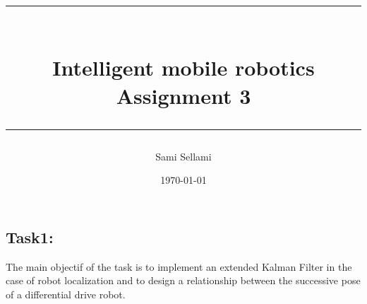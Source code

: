 \documentclass[11pt,a4paper]{report}
\title{
\rule{15cm}{1pt} \\
\Large {\bfseries Intelligent mobile robotics} \\
\Large {\bfseries Assignment 3}\\
\rule{15cm}{1pt}}
\author{Sami Sellami}
\date{\today}
\begin{document}
\setcounter{page}{1}
\setcounter{secnumdepth}{1}
	
\selectfont

\maketitle

\titlelabel{\thetitle)\quad}
\titlespacing{\chapter}{0cm}{0cm}{0cm}
\titlespacing{\section}{0.2cm}{0cm}{0cm}

\subsection{\textbf{Task1:}} 
The main objectif of the task is to implement an extended Kalman Filter in the case of robot localization and to design a relationship between the successive pose of a differential drive robot.\\
\end{document}
